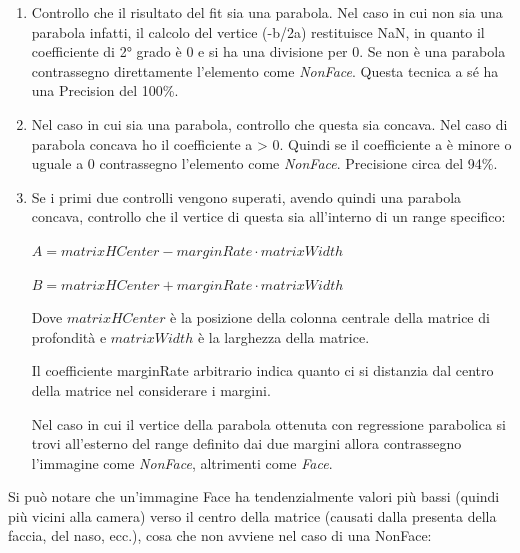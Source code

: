 \documentclass[
  italian,
]{article}
\begin{document}
\begin{enumerate}

\item Controllo che il risultato del fit sia una parabola. Nel caso in cui non sia una parabola infatti, il calcolo del vertice (-b/2a) restituisce NaN, in quanto il coefficiente di 2° grado è 0 e si ha una divisione per 0.
Se non è una parabola contrassegno direttamente l'elemento come \emph{NonFace}.
Questa tecnica a sé ha una Precision del 100\%.

\item Nel caso in cui sia una parabola, controllo che questa sia concava.
Nel caso di parabola concava ho il coefficiente a > 0.
Quindi se il coefficiente a è minore o uguale a 0 contrassegno l'elemento come \emph{NonFace}.
Precisione circa del 94\%.

\item Se i primi due controlli vengono superati, avendo quindi una parabola concava, controllo che il vertice di questa sia all'interno di un range specifico:

\(A = matrixHCenter - marginRate \cdot matrixWidth\)

\(B = matrixHCenter + marginRate \cdot matrixWidth\)

Dove \(matrixHCenter\) è la posizione della colonna centrale della
matrice di profondità e \(matrixWidth\) è la larghezza della matrice.

Il coefficiente marginRate arbitrario indica quanto ci si distanzia
dal centro della matrice nel considerare i margini.

Nel caso in cui il vertice della parabola ottenuta con regressione
parabolica si trovi all'esterno del range definito dai due margini allora contrassegno l'immagine come \emph{NonFace}, altrimenti
come \emph{Face}.

\end{enumerate}

\pagebreak

Si può notare che un'immagine Face ha tendenzialmente valori più bassi
(quindi più vicini alla camera) verso il centro della matrice (causati
dalla presenta della faccia, del naso, ecc.), cosa che non avviene nel caso di una NonFace:
\end{document}
